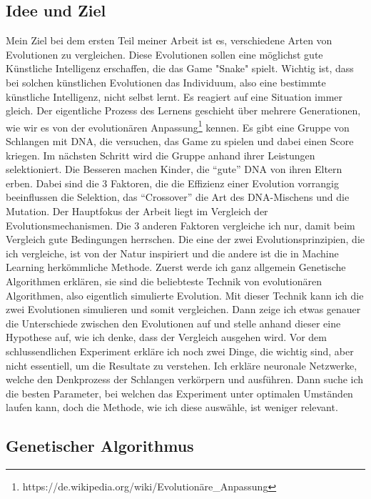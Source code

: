 \documentclass[11pt,a4paper,ngerman]{article}
\begin{document}
\subsection{Idee und Ziel}
Mein Ziel bei dem ersten Teil meiner Arbeit ist es, verschiedene Arten von Evolutionen zu vergleichen. Diese Evolutionen sollen eine möglichst gute Künstliche Intelligenz erschaffen, die das Game "Snake" spielt. Wichtig ist, dass bei solchen künstlichen Evolutionen das Individuum, also eine bestimmte künstliche Intelligenz, nicht selbst lernt. Es reagiert auf eine Situation immer gleich. Der eigentliche Prozess des Lernens geschieht über mehrere Generationen, wie wir es von der evolutionären Anpassung\footnote{https://de.wikipedia.org/wiki/Evolutionäre\_Anpassung} kennen. Es gibt eine Gruppe von Schlangen mit DNA, die versuchen, das Game zu spielen und dabei einen Score kriegen. Im nächsten Schritt wird die Gruppe anhand ihrer Leistungen selektioniert. Die Besseren machen Kinder, die \enquote{gute} DNA von ihren Eltern erben. Dabei sind die 3 Faktoren, die die Effizienz einer Evolution vorrangig beeinflussen die Selektion, das \enquote{Crossover} die Art des DNA-Mischens und die Mutation. Der Hauptfokus der Arbeit liegt im Vergleich der Evolutionsmechanismen. Die 3 anderen Faktoren vergleiche ich nur, damit beim Vergleich gute Bedingungen herrschen. Die eine der zwei Evolutionsprinzipien, die ich vergleiche, ist von der Natur inspiriert und die andere ist die in Machine Learning herkömmliche Methode. Zuerst werde ich ganz allgemein Genetische Algorithmen erklären, sie sind die beliebteste Technik von evolutionären Algorithmen, also eigentlich simulierte Evolution. Mit dieser Technik kann ich die zwei Evolutionen simulieren und somit vergleichen. Dann zeige ich etwas genauer die Unterschiede zwischen den Evolutionen auf und stelle anhand dieser eine Hypothese auf, wie ich denke, dass der Vergleich ausgehen wird. Vor dem schlussendlichen Experiment erkläre ich noch zwei Dinge, die wichtig sind, aber nicht essentiell, um die Resultate zu verstehen. Ich erkläre neuronale Netzwerke, welche den Denkprozess der Schlangen verkörpern und ausführen. Dann suche ich die besten Parameter, bei welchen das Experiment unter optimalen Umständen laufen kann, doch die Methode, wie ich diese auswähle, ist weniger relevant.

\subsection{Genetischer Algorithmus}
\end{document}
